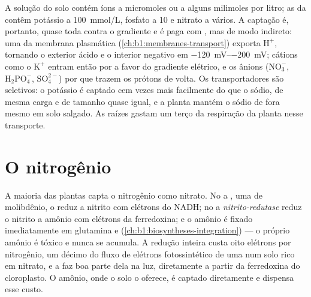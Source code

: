 \begin{proposition}\label{prop:b1:plant-water-minerals:uptake}
A solução do solo contém íons a micromoles ou a alguns milimoles por
litro; as  da  contêm potássio a \qty{100}{mmol/L}, fosfato
a \qty{10}{} e nitrato a vários. A captação é, portanto, quase toda
contra o gradiente e é paga com , mas de modo indireto: uma
\emph{} da membrana plasmática
(\cref{ch:b1:membranes-transport}) exporta $\mathrm{H^+}$, tornando o
exterior ácido e o interior negativo em
\qtyrange{-120}{-200}{mV}; cátions como o $\mathrm{K^+}$ entram então
por  a favor do gradiente elétrico, e os ânions
($\mathrm{NO_3^-}$, $\mathrm{H_2PO_4^-}$, $\mathrm{SO_4^{2-}}$) por
 que trazem os prótons de volta. Os transportadores são
seletivos: o potássio é captado cem vezes mais facilmente do que o
sódio, de mesma carga e de tamanho quase igual, e a planta mantém o
sódio de fora mesmo em solo salgado. As raízes gastam um terço da
respiração da planta nesse transporte.
\end{proposition}

\section{O nitrogênio}

\begin{proposition}\label{prop:b1:plant-water-minerals:nitrate}
A maioria das plantas capta o nitrogênio como nitrato. No  a
\emph{}, uma  de molibdênio, o reduz a nitrito
com elétrons do NADH; no  a \emph{nitrito-redutase} reduz o
nitrito a amônio com elétrons da ferredoxina; e o amônio é fixado
imediatamente em glutamina e 
(\cref{ch:b1:biosyntheses-integration}) --- o próprio amônio é tóxico e
nunca se acumula. A redução inteira custa oito elétrons por
nitrogênio, um décimo do fluxo de elétrons fotossintético de uma 
num solo rico em nitrato, e a  faz boa parte dela na luz,
diretamente a partir da ferredoxina do cloroplasto. O amônio, onde o
solo o oferece, é captado diretamente e dispensa esse custo.
\end{proposition}

